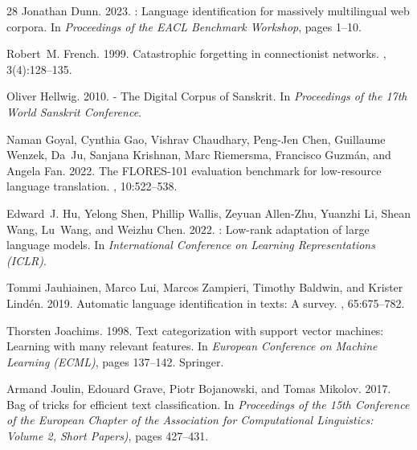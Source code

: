 \documentclass[11pt]{article}
\begin{document}
\begin{thebibliography}{28}
Jonathan Dunn. 2023.
: Language identification for massively multilingual web corpora.
\newblock In {\em Proceedings of the EACL Benchmark Workshop}, pages 1--10.

Robert~M. French. 1999.
\newblock Catastrophic forgetting in connectionist networks.
, 3(4):128--135.

Oliver Hellwig. 2010.
 - The Digital Corpus of Sanskrit.
\newblock In {\em Proceedings of the 17th World Sanskrit Conference}.

Naman Goyal, Cynthia Gao, Vishrav Chaudhary, Peng-Jen Chen, Guillaume Wenzek, Da~Ju, Sanjana Krishnan, Marc Riemersma, Francisco Guzm{\'a}n, and Angela Fan. 2022.
\newblock The {FLORES-101} evaluation benchmark for low-resource language translation.
, 10:522--538.

Edward~J. Hu, Yelong Shen, Phillip Wallis, Zeyuan Allen-Zhu, Yuanzhi Li, Shean Wang, Lu~Wang, and Weizhu Chen. 2022.
: Low-rank adaptation of large language models.
\newblock In {\em International Conference on Learning Representations (ICLR)}.

Tommi Jauhiainen, Marco Lui, Marcos Zampieri, Timothy Baldwin, and Krister Lind{\'e}n. 2019.
\newblock Automatic language identification in texts: A survey.
, 65:675--782.

Thorsten Joachims. 1998.
\newblock Text categorization with support vector machines: Learning with many relevant features.
\newblock In {\em European Conference on Machine Learning (ECML)}, pages 137--142. Springer.

Armand Joulin, Edouard Grave, Piotr Bojanowski, and Tomas Mikolov. 2017.
\newblock Bag of tricks for efficient text classification.
\newblock In {\em Proceedings of the 15th Conference of the European Chapter of the Association for Computational Linguistics: Volume 2, Short Papers)}, pages 427--431.


\end{thebibliography}
\end{document}
